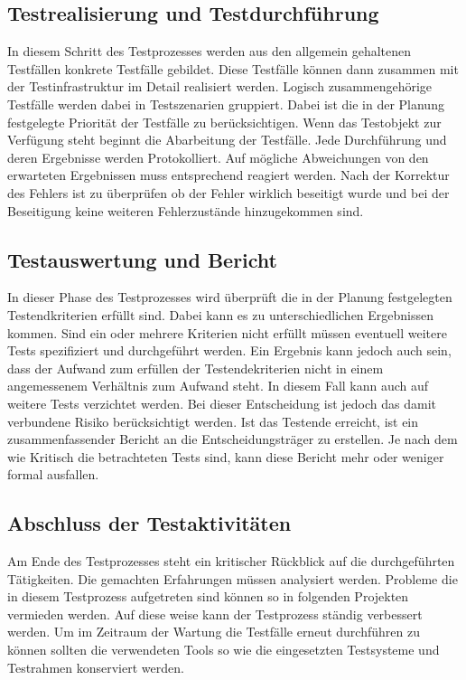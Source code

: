 \subsection{Testrealisierung und Testdurchführung}
\label{subsec:testrealisierung_und_durchführung}
In diesem Schritt des Testprozesses werden aus den allgemein gehaltenen Testfällen konkrete Testfälle gebildet. Diese Testfälle können dann zusammen mit der Testinfrastruktur im Detail realisiert werden. Logisch zusammengehörige Testfälle werden dabei in Testszenarien gruppiert. Dabei ist die in der Planung festgelegte Priorität der Testfälle zu berücksichtigen.
Wenn das Testobjekt zur Verfügung steht beginnt die Abarbeitung der Testfälle. Jede Durchführung und deren Ergebnisse werden Protokolliert. Auf mögliche Abweichungen von den erwarteten Ergebnissen muss entsprechend reagiert werden. Nach der Korrektur des Fehlers ist zu überprüfen ob der Fehler wirklich beseitigt wurde und bei der Beseitigung keine weiteren Fehlerzustände hinzugekommen sind.

\subsection{Testauswertung und Bericht}
\label{subsec:testauswertung_und_bericht}
In dieser Phase des Testprozesses wird überprüft die in der Planung festgelegten Testendkriterien erfüllt sind. Dabei kann es zu unterschiedlichen Ergebnissen kommen.
Sind ein oder mehrere Kriterien nicht erfüllt müssen eventuell weitere Tests spezifiziert und durchgeführt werden. Ein Ergebnis kann jedoch auch sein, dass der Aufwand zum erfüllen der Testendekriterien nicht in einem angemessenem Verhältnis zum Aufwand steht. In diesem Fall kann auch auf weitere Tests verzichtet werden. Bei dieser Entscheidung ist jedoch das damit verbundene Risiko berücksichtigt werden.
Ist das Testende erreicht, ist ein zusammenfassender Bericht an die Entscheidungsträger zu erstellen. Je nach dem wie Kritisch die betrachteten Tests sind, kann diese Bericht mehr oder weniger formal ausfallen.

\subsection{Abschluss der Testaktivitäten}
\label{subsec:abschluss_der_testaktivitäten}
Am Ende des Testprozesses steht ein kritischer Rückblick auf die durchgeführten Tätigkeiten. Die gemachten Erfahrungen müssen analysiert werden. Probleme die in diesem Testprozess aufgetreten sind können so in folgenden Projekten vermieden werden.
Auf diese weise kann der Testprozess ständig verbessert werden.
Um im Zeitraum der Wartung die Testfälle erneut durchführen zu können sollten die verwendeten Tools so wie die eingesetzten Testsysteme und Testrahmen konserviert werden.


